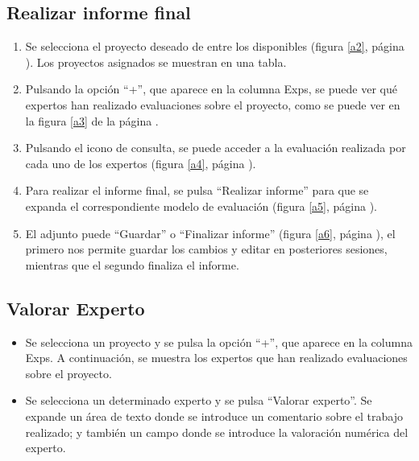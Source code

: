 \documentclass[11pt,a4paper,spanish,twoside]{book}
\begin{document}
\subsection{Realizar informe final}
\begin{enumerate}
\item Se selecciona el proyecto deseado de entre los disponibles (figura 
  \ref{a2}, página \pageref{a2}). Los proyectos asignados se muestran en
  una tabla.
  

\item Pulsando la opción ``+'', que aparece en la columna Exps, se puede ver qué
  expertos han realizado evaluaciones sobre el proyecto, como se puede ver en
  la figura \ref{a3} de la página \pageref{a3}. 


\item Pulsando el icono de consulta, se puede acceder a la evaluación realizada 
  por cada uno de los expertos (figura \ref{a4}, página \pageref{a4}).


\item Para realizar el informe final, se pulsa ``Realizar informe'' 
  para que se expanda el correspondiente modelo de evaluación (figura
  \ref{a5}, página \pageref{a5}).
  

\item El adjunto puede ``Guardar'' o ``Finalizar informe'' 
  (figura \ref{a6}, página \pageref{a6}), el primero nos permite guardar
  los cambios y editar en posteriores sesiones, mientras que el segundo
  finaliza el informe.
  
\end{enumerate}

\subsection{Valorar Experto}

\begin{itemize}
\item Se selecciona un proyecto y se pulsa la opción ``+'', que aparece en la
  columna Exps. A continuación, se muestra los expertos que han realizado
  evaluaciones sobre el proyecto.
\item Se selecciona un determinado experto y se pulsa ``Valorar experto''. Se
  expande un área de texto donde se introduce un comentario sobre el trabajo
  realizado; y también un campo donde se introduce la valoración numérica del
  experto. 
\end{itemize}
\end{document}
